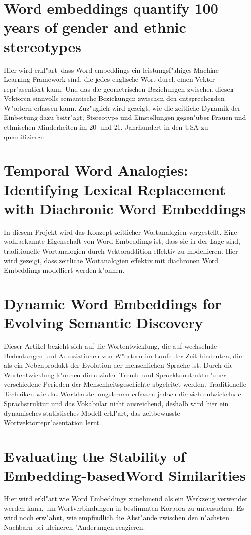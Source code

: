 \section{Word embeddings quantify 100 years of gender and ethnic stereotypes}
Hier wird erkl"art, dass Word embeddings ein leistungsf"ahiges Machine-Learning-Framework sind, die jedes englische Wort durch einen Vektor repr"asentiert kann. Und das die geometrischen Beziehungen zwischen diesen Vektoren sinnvolle semantische Beziehungen zwischen den entsprechenden W"ortern erfassen kann. Zuz"uglich wird gezeigt, wie die zeitliche Dynamik der Einbettung dazu beitr"agt, Stereotype und Einstellungen gegen"uber Frauen und ethnischen Minderheiten im 20. und 21. Jahrhundert in den USA zu quantifizieren.
\cite{Garg2018}
\section{Temporal Word Analogies: Identifying Lexical Replacement with Diachronic Word Embeddings}
In diesem Projekt wird das Konzept zeitlicher Wortanalogien vorgestellt.  Eine wohlbekannte Eigenschaft von Word Embeddings ist, dass sie in der Lage sind, traditionelle Wortanalogien durch Vektoraddition effektiv zu modellieren. Hier wird gezeigt, dass zeitliche Wortanalogien effektiv mit diachronen Word Embeddings modelliert werden k"onnen.
\cite{Szymanski2017}
\section{Dynamic Word Embeddings for Evolving Semantic Discovery}
Dieser Artikel bezieht sich auf die Wortentwicklung, die auf wechselnde Bedeutungen und Assoziationen von W"ortern im Laufe der Zeit hindeuten, die als ein Nebenprodukt der Evolution der menschlichen Sprache ist. Durch die Wortentwicklung k"onnen die sozialen Trends und Sprachkonstrukte "uber verschiedene Perioden der Menschheitsgeschichte abgeleitet werden. Traditionelle Techniken wie das Wortdarstellungslernen erfassen jedoch die sich entwickelnde Sprachstruktur und das Vokabular nicht ausreichend, deshalb wird hier ein dynamisches statistisches Modell erkl"art, das zeitbewusste Wortvektorrepr"asentation lernt.
\cite{Yao2018}
\section{Evaluating the Stability of Embedding-basedWord Similarities}
Hier wird erkl"art wie Word Embeddings zunehmend als ein Werkzeug verwendet werden kann, um Wortverbindungen in bestimmten Korpora zu untersuchen. Es wird noch erw"ahnt, wie empfindlich die Abst"ande zwischen den n"achsten Nachbarn bei kleineren "Anderungen reagieren.
\cite{Antoniak2018}
